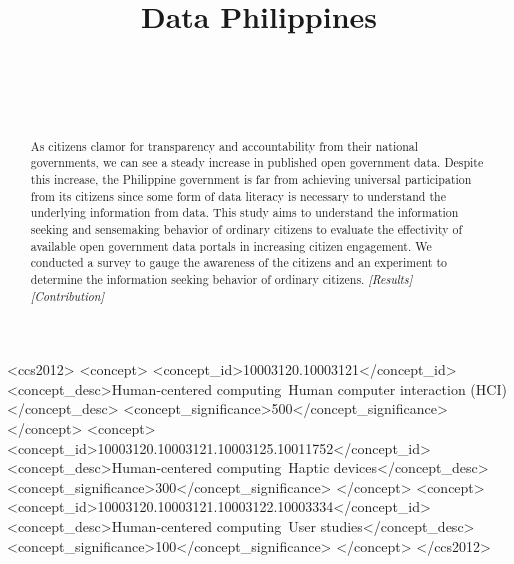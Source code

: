 \documentclass{sigchi}
\def\plaintitle{Data Philippines}
\begin{document}
\title{\plaintitle}

\author{%
  \\
  \\
  \\
}

\maketitle

\begin{abstract}
As citizens clamor for transparency and accountability from their national governments, we can see a steady increase in published open government data. Despite this increase, the Philippine government is far from achieving universal participation from its citizens since some form of data literacy is necessary to understand the underlying information from data. This study aims to understand the information seeking and sensemaking behavior of ordinary citizens to evaluate the effectivity of available open government data portals in increasing citizen engagement. We conducted a survey to gauge the awareness of the citizens and an experiment to determine the information seeking behavior of ordinary citizens. \textit{[Results]} \textit{[Contribution]}
\end{abstract}



\begin{CCSXML}
<ccs2012>
<concept>
<concept_id>10003120.10003121</concept_id>
<concept_desc>Human-centered computing~Human computer interaction (HCI)</concept_desc>
<concept_significance>500</concept_significance>
</concept>
<concept>
<concept_id>10003120.10003121.10003125.10011752</concept_id>
<concept_desc>Human-centered computing~Haptic devices</concept_desc>
<concept_significance>300</concept_significance>
</concept>
<concept>
<concept_id>10003120.10003121.10003122.10003334</concept_id>
<concept_desc>Human-centered computing~User studies</concept_desc>
<concept_significance>100</concept_significance>
</concept>
</ccs2012>
\end{CCSXML}
\end{document}
